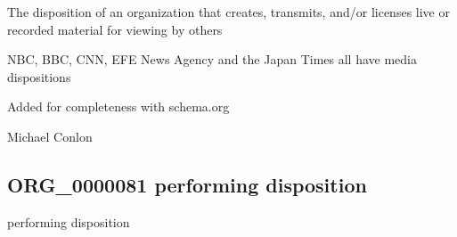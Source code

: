 \documentclass[letterpaper,10pt,english]{sphinxmanual}
\begin{document}
\begin{sphinxShadowBox}

\sphinxAtStartPar
{\hyperref[\detokenize{doc-BFO_0000016::doc}]{}}
\end{sphinxShadowBox}

\begin{sphinxShadowBox}

\sphinxAtStartPar
The disposition of an organization that creates, transmits, and/or licenses live or recorded material for viewing by others
\end{sphinxShadowBox}

\begin{sphinxShadowBox}

\sphinxAtStartPar
{}
\end{sphinxShadowBox}

\begin{sphinxShadowBox}

\sphinxAtStartPar
NBC, BBC, CNN, EFE News Agency and the Japan Times all have media dispositions
\end{sphinxShadowBox}

\begin{sphinxShadowBox}

\sphinxAtStartPar
Added for completeness with schema.org
\end{sphinxShadowBox}

\begin{sphinxShadowBox}

\sphinxAtStartPar
Michael Conlon 
\end{sphinxShadowBox}
\begin{quote}

\ignorespaces \end{quote}


\subsection{ORG\_0000081 \sphinxhyphen{} performing disposition}
\label{\detokenize{doc-ORG_0000081:org-0000081-performing-disposition}}\label{\detokenize{doc-ORG_0000081:index-0}}\label{\detokenize{doc-ORG_0000081::doc}}
\begin{sphinxShadowBox}

\sphinxAtStartPar
performing disposition
\end{sphinxShadowBox}
\end{document}
